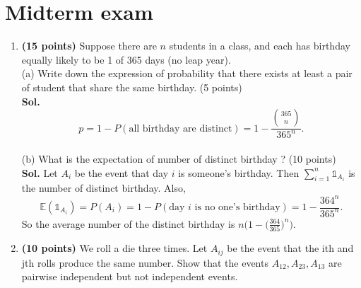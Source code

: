 \documentclass[12pt]{article}
\begin{document}
\section*{Midterm exam}
\begin{enumerate}
    \item \textbf{(15 points)} Suppose there are \(n\) students in a class, and each has birthday equally likely to be 1 of 365 days (no leap year).\\
    (a) Write down the expression of probability that there exists at least a pair of student that share the same birthday. (5 points)\\
    \textbf{Sol.}
\begin{equation*}    
    p=1-P(\text{all birthday are distinct})=1-\frac{\binom{365}{n}}{365^n}.
    \end{equation*}
    \\
    (b) What is the expectation of number of distinct birthday ? (10 points)\\
    \textbf{Sol.} Let $A_i$ be the event that day $i$ is someone's birthday. Then $\sum_{i=1}^n\mathds{1}_{A_i}$ is the number of distinct birthday. Also,
\begin{equation*}    
\mathbb{E}(\mathds{1}_{A_i})=P(A_i)=1-P(\text{day $i$ is no one's birthday})=1-\frac{364^n}{365^n}.
\end{equation*}
So the average number of the distinct birthday is $n\big(1-\big(\frac{364}{365}\big)^n\big)$.

    \item \textbf{(10 points)} We roll a die three times. Let \(A_{ij}\) be the event that the ith and jth rolls produce the same number.
    Show that the events \(A_{12}, A_{23}, A_{13}\) are pairwise independent but not independent events.


\end{enumerate}
\end{document}
